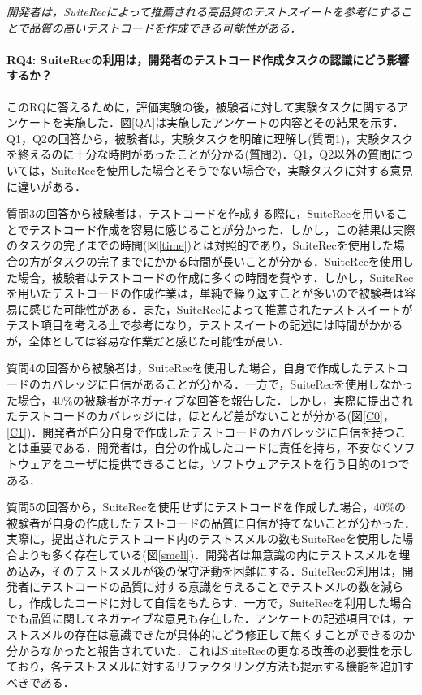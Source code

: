 \documentclass[12pt]{jarticle} %
\begin{document}
\vspace{\baselineskip}

\begin{breakbox}
\textit{開発者は，{\sf SuiteRec}によって推薦される高品質のテストスイートを参考にすることで品質の高いテストコードを作成できる可能性がある．}
\end{breakbox}

\paragraph{RQ4: {\sf SuiteRec}の利用は，開発者のテストコード作成タスクの認識にどう影響するか？}

このRQに答えるために，評価実験の後，被験者に対して実験タスクに関するアンケートを実施した．図\ref{QA}は実施したアンケートの内容とその結果を示す．Q1，Q2の回答から，被験者は，実験タスクを明確に理解し(質問1)，実験タスクを終えるのに十分な時間があったことが分かる(質問2)．Q1，Q2以外の質問については，{\sf SuiteRec}を使用した場合とそうでない場合で，実験タスクに対する意見に違いがある．

質問3の回答から被験者は，テストコードを作成する際に，{\sf SuiteRec}を用いることでテストコード作成を容易に感じることが分かった．しかし，この結果は実際のタスクの完了までの時間(図\ref{time})とは対照的であり，{\sf SuiteRec}を使用した場合の方がタスクの完了までにかかる時間が長いことが分かる．{\sf SuiteRec}を使用した場合，被験者はテストコードの作成に多くの時間を費やす．しかし，{\sf SuiteRec}を用いたテストコードの作成作業は，単純で繰り返すことが多いので被験者は容易に感じた可能性がある．また，{\sf SuiteRec}によって推薦されたテストスイートがテスト項目を考える上で参考になり，テストスイートの記述には時間がかかるが，全体としては容易な作業だと感じた可能性が高い．

質問4の回答から被験者は，{\sf SuiteRec}を使用した場合，自身で作成したテストコードのカバレッジに自信があることが分かる．一方で，{\sf SuiteRec}を使用しなかった場合，40\%の被験者がネガティブな回答を報告した．しかし，実際に提出されたテストコードのカバレッジには，ほとんど差がないことが分かる(図\ref{C0}，\ref{C1})．開発者が自分自身で作成したテストコードのカバレッジに自信を持つことは重要である．開発者は，自分の作成したコードに責任を持ち，不安なくソフトウェアをユーザに提供できることは，ソフトウェアテストを行う目的の1つである．

質問5の回答から，{\sf SuiteRec}を使用せずにテストコードを作成した場合，40\%の被験者が自身の作成したテストコードの品質に自信が持てないことが分かった．実際に，提出されたテストコード内のテストスメルの数も{\sf SuiteRec}を使用した場合よりも多く存在している(図\ref{smell})．開発者は無意識の内にテストスメルを埋め込み，そのテストスメルが後の保守活動を困難にする．{\sf SuiteRec}の利用は，開発者にテストコードの品質に対する意識を与えることでテストメルの数を減らし，作成したコードに対して自信をもたらす．一方で，{\sf SuiteRec}を利用した場合でも品質に関してネガティブな意見も存在した．アンケートの記述項目では，テストスメルの存在は意識できたが具体的にどう修正して無くすことができるのか分からなかったと報告されていた．これは{\sf SuiteRec}の更なる改善の必要性を示しており，各テストスメルに対するリファクタリング方法も提示する機能を追加すべきである．
\end{document}
